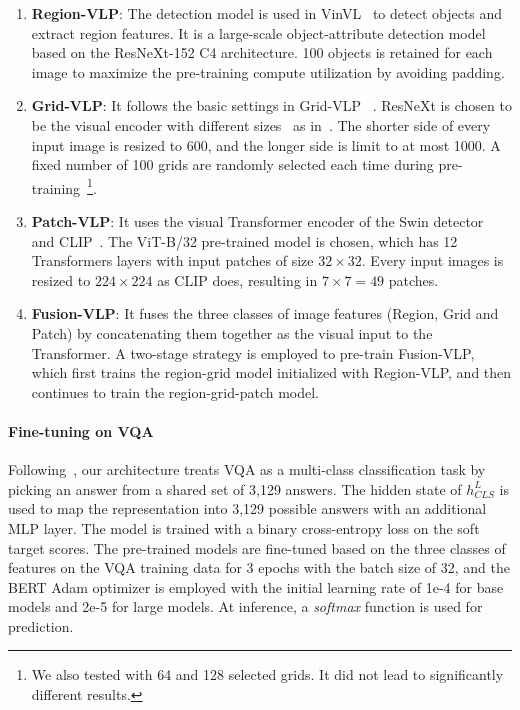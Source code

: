 \begin{enumerate}
    \item \textbf{Region-VLP}: The detection model is used in VinVL~\citep{zhang2021vinvl} to detect objects and extract region features. It is a large-scale object-attribute detection model based on the ResNeXt-152 C4 architecture. 100 objects is retained for each image to maximize the pre-training compute utilization by avoiding padding.
    
    \item \textbf{Grid-VLP}: It follows the basic settings in Grid-VLP~\citep{yan2021gridvlp}
    . ResNeXt is chosen to be the visual encoder with different sizes~\citep{xie2017aggregated} as in~\citep{jiang2020defense,huang2020pixel}. The shorter side of every input image is resized to 600, and the longer side is limit to at most 1000. A fixed number of 100 grids are randomly selected each time during pre-training~\footnote{\small{We also tested with 64 and 128 selected grids. It did not lead to significantly different results.}}. 
    
    \item \textbf{Patch-VLP}: It uses the visual Transformer encoder of the Swin detector~\citep{liu2021swin} and CLIP~\citep{radford2021learning}. The ViT-B/32 pre-trained model is chosen, which has 12 Transformers layers with input patches of size $32 \times 32$. Every input images is resized to $224 \times 224$ as CLIP does, resulting in $7\times7=49$ patches.
    
    \item \textbf{Fusion-VLP}: It fuses the three classes of image features (Region, Grid and Patch) by concatenating them together as the visual input to the Transformer. A two-stage strategy is employed to pre-train Fusion-VLP, which first trains the region-grid model initialized with Region-VLP, and then continues to train the region-grid-patch model.
\end{enumerate}

\paragraph{Fine-tuning on VQA}
Following~\citep{anderson2018bottom}, our architecture treats VQA as a multi-class classification task by picking an answer from a shared set of 3,129 answers. The hidden state of $h^L_{CLS}$ is used to map the representation into 3,129 possible answers with an additional MLP layer. The model is trained with a binary cross-entropy loss on the soft target scores. The pre-trained models are fine-tuned based on the three classes of features on the VQA training data for 3 epochs with the batch size of 32, and the BERT Adam optimizer is employed with the initial learning rate of 1e-4 for base models and 2e-5 for large models. At inference, a \emph{softmax} function is used for prediction.

